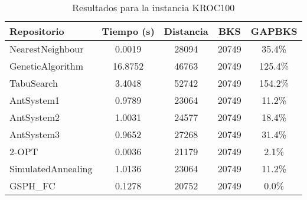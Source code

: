 \begin{table}[H]
\centering
\caption{Resultados para la instancia KROC100}
\begin{tabular}{|l|c|c|c|c|}
\hline
\textbf{Repositorio} & \textbf{Tiempo (s)} & \textbf{Distancia} & \textbf{BKS} & \textbf{GAPBKS} \\ 
\hline
NearestNeighbour & 0.0019 & 28094 & 20749 & 35.4\% \\ 
GeneticAlgorithm & 16.8752 & 46763 & 20749 & 125.4\% \\ 
TabuSearch & 3.4048 & 52742 & 20749 & 154.2\% \\ 
AntSystem1 & 0.9789 & 23064 & 20749 & 11.2\% \\ 
AntSystem2 & 1.0031 & 24577 & 20749 & 18.4\% \\ 
AntSystem3 & 0.9652 & 27268 & 20749 & 31.4\% \\ 
2-OPT & 0.0036 & 21179 & 20749 & 2.1\% \\ 
SimulatedAnnealing & 1.0136 & 23064 & 20749 & 11.2\% \\ 
GSPH_FC & 0.1278 & 20752 & 20749 & 0.0\% \\ 
\hline
\end{tabular}
\end{table}
